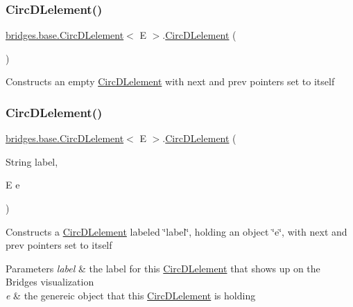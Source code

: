 \subsubsection{\texorpdfstring{Circ\+D\+Lelement()}{CircDLelement()}\hspace{0.1cm}{\footnotesize\ttfamily [1/4]}}
{\footnotesize\ttfamily \hyperlink{classbridges_1_1base_1_1_circ_d_lelement}{bridges.\+base.\+Circ\+D\+Lelement}$<$ E $>$.\hyperlink{classbridges_1_1base_1_1_circ_d_lelement}{Circ\+D\+Lelement} (\begin{DoxyParamCaption}{ }\end{DoxyParamCaption})}

Constructs an empty \hyperlink{classbridges_1_1base_1_1_circ_d_lelement}{Circ\+D\+Lelement} with next and prev pointers set to itself \mbox{\label{classbridges_1_1base_1_1_circ_d_lelement_a84b2ebf47d2ca24077a800b240d8d157}} 
\subsubsection{\texorpdfstring{Circ\+D\+Lelement()}{CircDLelement()}\hspace{0.1cm}{\footnotesize\ttfamily [2/4]}}
{\footnotesize\ttfamily \hyperlink{classbridges_1_1base_1_1_circ_d_lelement}{bridges.\+base.\+Circ\+D\+Lelement}$<$ E $>$.\hyperlink{classbridges_1_1base_1_1_circ_d_lelement}{Circ\+D\+Lelement} (\begin{DoxyParamCaption}\item[{String}]{label,  }\item[{E}]{e }\end{DoxyParamCaption})}

Constructs a \hyperlink{classbridges_1_1base_1_1_circ_d_lelement}{Circ\+D\+Lelement} labeled \char`\"{}label\char`\"{}, holding an object \char`\"{}e\char`\"{}, with next and prev pointers set to itself


\begin{DoxyParams}{Parameters}
{\em label} & the label for this \hyperlink{classbridges_1_1base_1_1_circ_d_lelement}{Circ\+D\+Lelement} that shows up on the Bridges visualization \\
\hline
{\em e} & the genereic object that this \hyperlink{classbridges_1_1base_1_1_circ_d_lelement}{Circ\+D\+Lelement} is holding \\
\hline
\end{DoxyParams}
\mbox{\label{classbridges_1_1base_1_1_circ_d_lelement_a98a471fc3225ed80595e1ffdb377e336}} 
